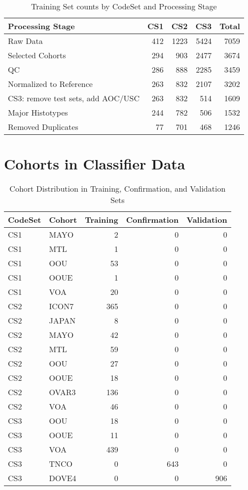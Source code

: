 \documentclass[
]{report}
\begin{document}
\begin{table}

\caption{\label{tab:cohort-counts}Training Set counts by CodeSet and Processing Stage}
\centering
\begin{tabular}[t]{l|r|r|r|r}
\hline
Processing Stage & CS1 & CS2 & CS3 & Total\\
\hline
Raw Data & 412 & 1223 & 5424 & 7059\\
\hline
Selected Cohorts & 294 & 903 & 2477 & 3674\\
\hline
QC & 286 & 888 & 2285 & 3459\\
\hline
Normalized to Reference & 263 & 832 & 2107 & 3202\\
\hline
CS3: remove test sets, add AOC/USC & 263 & 832 & 514 & 1609\\
\hline
Major Histotypes & 244 & 782 & 506 & 1532\\
\hline
Removed Duplicates & 77 & 701 & 468 & 1246\\
\hline
\end{tabular}
\end{table}

\hypertarget{cohorts-in-classifier-data}{%
\section{Cohorts in Classifier Data}\label{cohorts-in-classifier-data}}

\begin{table}

\caption{\label{tab:cohort-dist}Cohort Distribution in Training, Confirmation, and Validation Sets}
\centering
\begin{tabular}[t]{l|l|r|r|r}
\hline
CodeSet & Cohort & Training & Confirmation & Validation\\
\hline
CS1 & MAYO & 2 & 0 & 0\\
\hline
CS1 & MTL & 1 & 0 & 0\\
\hline
CS1 & OOU & 53 & 0 & 0\\
\hline
CS1 & OOUE & 1 & 0 & 0\\
\hline
CS1 & VOA & 20 & 0 & 0\\
\hline
CS2 & ICON7 & 365 & 0 & 0\\
\hline
CS2 & JAPAN & 8 & 0 & 0\\
\hline
CS2 & MAYO & 42 & 0 & 0\\
\hline
CS2 & MTL & 59 & 0 & 0\\
\hline
CS2 & OOU & 27 & 0 & 0\\
\hline
CS2 & OOUE & 18 & 0 & 0\\
\hline
CS2 & OVAR3 & 136 & 0 & 0\\
\hline
CS2 & VOA & 46 & 0 & 0\\
\hline
CS3 & OOU & 18 & 0 & 0\\
\hline
CS3 & OOUE & 11 & 0 & 0\\
\hline
CS3 & VOA & 439 & 0 & 0\\
\hline
CS3 & TNCO & 0 & 643 & 0\\
\hline
CS3 & DOVE4 & 0 & 0 & 906\\
\hline
\end{tabular}
\end{table}
\end{document}
